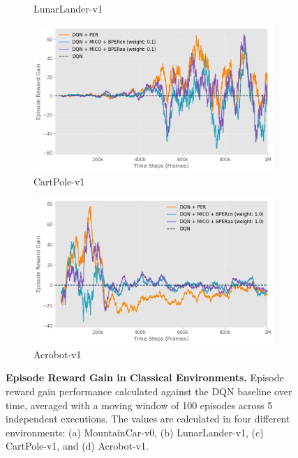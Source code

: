 \begin{figure}[h]
\begin{subfigure}{0.45\textwidth}
        \caption{LunarLander-v1}
        \label{fig:lunarlander_reward_gain_vs_dqn}
    \end{subfigure}
    \hfill
    \begin{subfigure}{0.45\textwidth}
        \includegraphics[width=\linewidth]{Results/general_results/cart_polev1_reward_gain_vs_dqn.png}
        \caption{CartPole-v1}
        \label{fig:cart_polev1_reward_gain_vs_dqn}
    \end{subfigure}
    \hfill
    \begin{subfigure}{0.45\textwidth}
        \includegraphics[width=\linewidth]{Results/general_results/acrobotv1_reward_gain_vs_dqn.png}
        \caption{Acrobot-v1}
        \label{fig:acrobotv1_reward_gain_vs_dqn}
    \end{subfigure}
    \caption[Episode Reward Gain in Classical Environments]{\textbf{Episode Reward Gain in Classical Environments.} Episode reward gain performance calculated against the DQN baseline over time, averaged with a moving window of 100 episodes across 5 independent executions. The values are calculated in four different environments: (a) MountainCar-v0, (b) LunarLander-v1, (c) CartPole-v1, and (d) Acrobot-v1.}
    \label{fig:reward_gain_vs_dqn_methods}
\end{figure}


